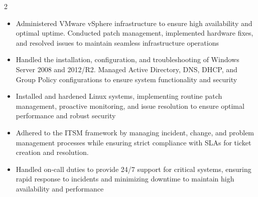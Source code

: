 \documentclass[11pt,a3paper,ragged2e,withhyper]{altacv}
\begin{document}
\begin{paracol}{2}
\begin{itemize}
  \item Administered VMware vSphere infrastructure to ensure high availability and optimal uptime. Conducted patch management, implemented hardware fixes, and resolved issues to maintain seamless infrastructure operations
  \item Handled the installation, configuration, and troubleshooting of Windows Server 2008 and 2012/R2. Managed Active Directory, DNS, DHCP, and Group Policy configurations to ensure system functionality and security
  \item Installed and hardened Linux systems, implementing routine patch management, proactive monitoring, and issue resolution to ensure optimal performance and robust security
  \item Adhered to the ITSM framework by managing incident, change, and problem management processes while ensuring strict compliance with SLAs for ticket creation and resolution.
  \item Handled on-call duties to provide 24/7 support for critical systems, ensuring rapid response to incidents and minimizing downtime to maintain high availability and performance
\end{itemize}





\end{paracol}
\end{document}
